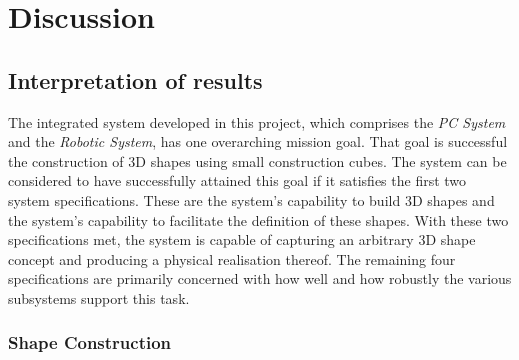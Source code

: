 
\section{Discussion}



\subsection{Interpretation of results}


The integrated system developed in this project, which comprises the \textit{PC System} and the \textit{Robotic System}, has one overarching mission goal. That goal is successful the construction of 3D shapes using small construction cubes. The system can be considered to have successfully attained this goal if it satisfies the first two system specifications. These are the system's capability to build 3D shapes and the system's capability to facilitate the definition of these shapes. With these two specifications met, the system is capable of capturing an arbitrary 3D shape concept and producing a physical realisation thereof. The remaining four specifications are primarily concerned with how well and how robustly the various subsystems support this task.

\subsubsection{Shape Construction}

